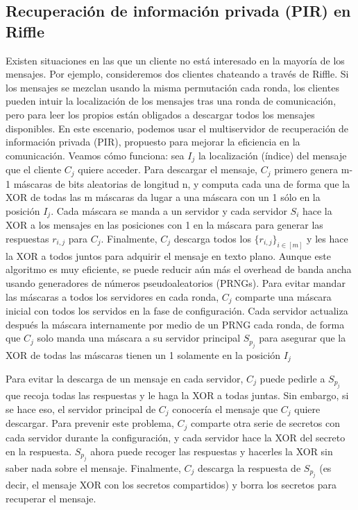 \begin{enumerate}
\subsection{Recuperación de información privada (PIR) en Riffle}
Existen situaciones en las que un cliente no está interesado en la mayoría de los mensajes. Por ejemplo, consideremos dos clientes
chateando a través de Riffle. Si los mensajes se mezclan usando la misma permutación cada ronda, los clientes pueden intuir la localización de los mensajes tras una ronda de comunicación, pero para leer los propios
están obligados a descargar todos los mensajes disponibles. En este escenario, podemos usar el multiservidor de recuperación de información privada (PIR), propuesto para mejorar la eficiencia en la comunicación. 
Veamos cómo funciona: sea $I_j$ la localización (índice) del mensaje que el cliente $C_j$ quiere acceder. Para descargar el mensaje, $C_j$
primero genera m-1 máscaras de bits aleatorias de longitud n, y computa cada una de forma que la XOR de todas las m máscaras da lugar a una máscara con un 1 sólo en la posición $I_j$. Cada máscara se manda a un servidor y cada servidor $S_i$ hace la XOR a los mensajes en las posiciones con 1 en la máscara para generar las respuestas $r_{i,j}$ para $C_j$. Finalmente, $C_j$ descarga todos los $\{r_{i,j}\}_{i \in [m]}$ y les hace la XOR a todos juntos para adquirir el mensaje en texto plano. 
Aunque este algoritmo es muy eficiente, se puede reducir aún más el overhead de banda ancha usando generadores de números pseudoaleatorios (PRNGs). Para evitar mandar las máscaras a todos los servidores en cada ronda, $C_j$ comparte una máscara inicial con todos los servidos en la fase de configuración. Cada servidor actualiza después la máscara internamente por medio de un PRNG cada ronda, de forma que $C_j$ solo manda una máscara a su servidor principal $S_{p_j}$ para asegurar que la XOR de todas las máscaras tienen un 1 solamente en la posición $I_j$

Para evitar la descarga de un mensaje en cada servidor, $C_j$ puede pedirle a $S_{p_j}$ que recoja todas las respuestas y le haga la XOR a todas juntas. Sin embargo, si se hace eso, el servidor principal de $C_j$ conocería el mensaje que $C_j$ quiere descargar. Para prevenir este problema, $C_j$ comparte otra serie de secretos con cada servidor durante la configuración, y cada servidor hace la XOR del secreto en la respuesta. $S_{p_j}$ ahora puede recoger las respuestas y hacerles la XOR sin saber nada sobre el mensaje. Finalmente, $C_j$ descarga la respuesta de $S_{p_j}$ (es decir, el mensaje XOR con los secretos compartidos) y borra los secretos para recuperar el mensaje. 


\end{enumerate}
